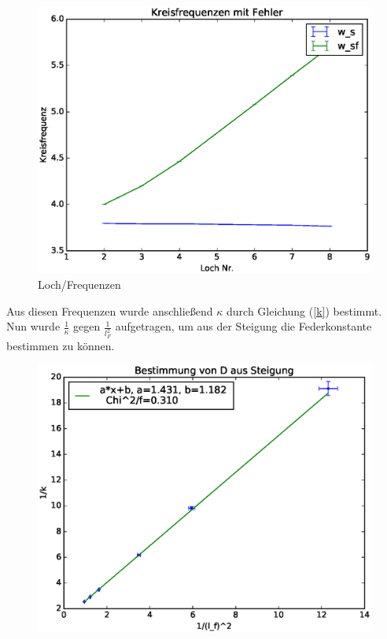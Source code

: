 \documentclass[12pt,a4paper]{article}
\begin{document}
\begin{figure}[H]
\centering
\includegraphics[scale=0.7]{Bilder/Kreisfrequenzen_fuer_Kappa.eps}
\caption{Loch/Frequenzen}
\end{figure}
Aus diesen Frequenzen wurde anschließend $\kappa$ durch Gleichung (\ref{k}) bestimmt.
\newline
Nun wurde $\frac{1}{\kappa}$ gegen $\frac{1}{l_F^2}$ aufgetragen, um aus der Steigung die Federkonstante bestimmen zu können.
\begin{figure}[H]
\centering
\caption{}
\includegraphics[scale=0.7]{Bilder/Bestimmung_D_linreg.eps}
\end{figure}
\end{document}
